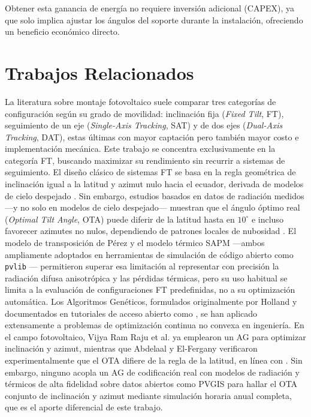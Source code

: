 \documentclass[12pt, a4paper, twocolumn]{article}
\begin{document}
Obtener esta ganancia de energía no requiere inversión adicional (CAPEX), ya que solo implica ajustar los ángulos del soporte durante la instalación, ofreciendo un beneficio económico directo.

\section{Trabajos Relacionados}
La literatura sobre montaje fotovoltaico suele comparar tres categorías de configuración según su grado de movilidad: inclinación fija (\textit{Fixed Tilt}, FT), seguimiento de un eje (\textit{Single-Axis Tracking}, SAT) y de dos ejes (\textit{Dual-Axis Tracking}, DAT), estas últimas con mayor captación pero también mayor costo e implementación mecánica. Este trabajo se concentra exclusivamente en la categoría FT, buscando maximizar su rendimiento sin recurrir a sistemas de seguimiento. El diseño clásico de sistemas FT se basa en la regla geométrica de inclinación igual a la latitud y azimut nulo hacia el ecuador, derivada de modelos de cielo despejado \cite{lave2011optimum}. Sin embargo, estudios basados en datos de radiación medidos —y no solo en modelos de cielo despejado— muestran que el ángulo óptimo real (\textit{Optimal Tilt Angle}, OTA) puede diferir de la latitud hasta en $10^\circ$ e incluso favorecer azimutes no nulos, dependiendo de patrones locales de nubosidad \cite{lave2011optimum}. El modelo de transposición de Pérez \cite{perez1990new} y el modelo térmico SAPM \cite{king2004sandia} —ambos ampliamente adoptados en herramientas de simulación de código abierto como \texttt{pvlib} \cite{pvlib}— permitieron superar esa limitación al representar con precisión la radiación difusa anisotrópica y las pérdidas térmicas, pero su uso habitual se limita a la evaluación de configuraciones FT predefinidas, no a su optimización automática. Los Algoritmos Genéticos, formulados originalmente por Holland y documentados en tutoriales de acceso abierto como \cite{whitley1994tutorial}, se han aplicado extensamente a problemas de optimización continua no convexa en ingeniería. En el campo fotovoltaico, Vijya Ram Raju et al. \cite{vijyaramraju2024optimization} ya emplearon un AG para optimizar inclinación y azimut, mientras que Abdelaal y El-Fergany \cite{abdelaal2023estimation} verificaron experimentalmente que el OTA difiere de la regla de la latitud, en línea con \cite{lave2011optimum}. Sin embargo, ninguno acopla un AG de codificación real con modelos de radiación y térmicos de alta fidelidad sobre datos abiertos como PVGIS \cite{huld2012pvgis} para hallar el OTA conjunto de inclinación y azimut mediante simulación horaria anual completa, que es el aporte diferencial de este trabajo.
\end{document}
